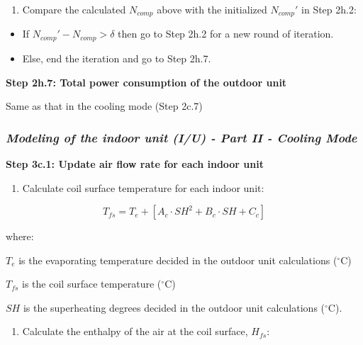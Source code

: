 \begin{enumerate}
\def\labelenumi{(\arabic{enumi})}
\setcounter{enumi}{1}
\tightlist
\item
  Compare the calculated \(N_{comp}\) above with the initialized \({N_{comp}}'\) in Step 2h.2:
\end{enumerate}

\begin{itemize}
\item
  If \({N_{comp}}'-N_{comp}>\delta\) then go to Step 2h.2 for a new round of iteration.
\item
  Else, end the iteration and go to Step 2h.7.
\end{itemize}

\textbf{Step 2h.7: Total power consumption of the outdoor unit}

Same as that in the cooling mode (Step 2c.7)

\subsubsection{\emph{Modeling of the indoor unit (I/U) - Part II - Cooling Mode}}\label{modeling-of-the-indoor-unit-iu---part-ii---cooling-mode}

\textbf{Step 3c.1: Update air flow rate for each indoor unit}

\begin{enumerate}
\def\labelenumi{(\arabic{enumi})}
\tightlist
\item
  Calculate coil surface temperature for each indoor unit:
\end{enumerate}

\begin{equation}
T_{fs} = T_e+[A_c\cdot SH^2+B_c\cdot SH+C_c]
\end{equation}

where:

\(T_e\) is the evaporating temperature decided in the outdoor unit calculations (\(^{\circ}\)C)

\(T_{fs}\) is the coil surface temperature (\(^{\circ}\)C)

\(SH\) is the superheating degrees decided in the outdoor unit calculations (\(^{\circ}\)C).

\begin{enumerate}
\def\labelenumi{\arabic{enumi})}
\setcounter{enumi}{1}
\tightlist
\item
  Calculate the enthalpy of the air at the coil surface, \(H_{fs}\):
\end{enumerate}

